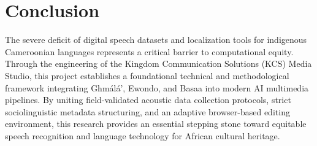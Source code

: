 \documentclass[a4paper,11pt]{article}
\begin{document}
\section{Conclusion}
\label{sec:conclusion}

The severe deficit of digital speech datasets and localization tools for indigenous Cameroonian languages represents a critical barrier to computational equity. Through the engineering of the Kingdom Communication Solutions (KCS) Media Studio, this project establishes a foundational technical and methodological framework integrating Gh\textopeno m\'al\'a', Ewondo, and Basaa into modern AI multimedia pipelines. By uniting field-validated acoustic data collection protocols, strict sociolinguistic metadata structuring, and an adaptive browser-based editing environment, this research provides an essential stepping stone toward equitable speech recognition and language technology for African cultural heritage.

\newpage
\appendix
\nocite{*}
\printbibliography[heading=bibintoc]
\end{document}

